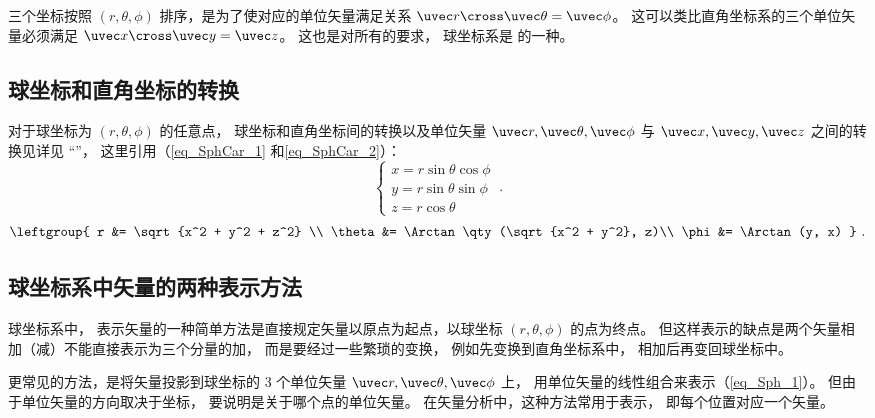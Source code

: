 三个坐标按照 $(r, \theta , \phi )$ 排序，是为了使对应的单位矢量满足关系 $\uvec r \cross \uvec \theta  = \uvec \phi $。 这可以类比直角坐标系的三个单位矢量必须满足 $\uvec x \cross \uvec y = \uvec z$。 这也是对所有的要求， 球坐标系是 的一种。

\subsection{球坐标和直角坐标的转换}
对于球坐标为 $(r, \theta , \phi )$ 的任意点， 球坐标和直角坐标间的转换以及单位矢量 $\uvec r, \uvec \theta, \uvec \phi$  与 $\uvec x, \uvec y, \uvec z$ 之间的转换见详见 “”， 这里引用（\autoref{eq_SphCar_1}  和\autoref{eq_SphCar_2}）：
\begin{equation}
\begin{cases}
x = r\sin \theta \cos \phi \\
y = r\sin \theta \sin \phi \\
z = r\cos \theta 
\end{cases}~.
\end{equation}
\begin{equation}
\leftgroup{
r &= \sqrt {x^2 + y^2 + z^2} \\
\theta  &= \Arctan\qty(\sqrt{x^2 + y^2}, z)\\
\phi  &= \Arctan(y, x)
}~.\end{equation}

\sub
 
\subsection{球坐标系中矢量的两种表示方法}
球坐标系中， 表示矢量的一种简单方法是直接规定矢量以原点为起点，以球坐标 $(r, \theta, \phi)$ 的点为终点。 但这样表示的缺点是两个矢量相加（减）不能直接表示为三个分量的加， 而是要经过一些繁琐的变换， 例如先变换到直角坐标系中， 相加后再变回球坐标中。

更常见的方法，是将矢量投影到球坐标的 3 个单位矢量 $\uvec r, \uvec \theta, \uvec \phi$ 上， 用单位矢量的线性组合来表示（\autoref{eq_Sph_1}）。 但由于单位矢量的方向取决于坐标， 要说明是关于哪个点的单位矢量。 在矢量分析中，这种方法常用于表示， 即每个位置对应一个矢量。

